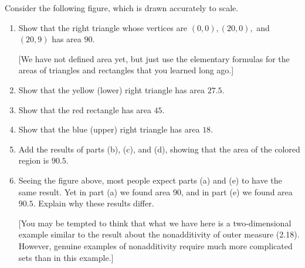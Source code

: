 \begin{exercise}\label{chapter2:sectionA:exercise14}
    Consider the following figure, which is drawn accurately to scale.
    \begin{center}
    \end{center}

    \begin{enumerate}[label={(\alph*)}]
        \item Show that the right triangle whose vertices are $(0, 0), (20, 0),$ and $(20, 9)$ has area $90$.

                  [We have not defined area yet, but just use the elementary formulas for the areas of triangles and rectangles that you learned long ago.]
        \item Show that the yellow (lower) right triangle has area $27.5$.
        \item Show that the red rectangle has area $45$.
        \item Show that the blue (upper) right triangle has area $18$.
        \item Add the results of parts (b), (c), and (d), showing that the area of the colored region is $90.5$.
        \item Seeing the figure above, most people expect parts (a) and (e) to have the same result. Yet in part (a) we found area 90, and in part (e) we found area $90.5$. Explain why these results differ.

                  [You may be tempted to think that what we have here is a two-dimensional example similar to the result about the nonadditivity of outer measure (2.18). However, genuine examples of nonadditivity require much more complicated sets than in this example.]
    \end{enumerate}
\end{exercise}

